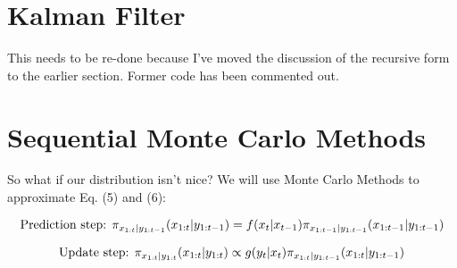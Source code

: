 \documentclass{article}
\begin{document}
\section{Kalman Filter}

This needs to be re-done because I've moved the discussion of the recursive form to the earlier section. Former code has been commented out.




\section{Sequential Monte Carlo Methods}

So what if our distribution isn't nice? We will use Monte Carlo Methods to approximate Eq. (5) and (6):

\begin{equation}
\textnormal{Prediction step:  }
\pi_{x_{1:t}|y_{1:t-1}}(x_{1:t}|y_{1:t-1})= f(x_t|x_{t-1}) \pi_{x_{1:t-1}|y_{1:t-1}}(x_{1:t-1}|y_{1:t-1})
\end{equation}

\begin{equation}
\textnormal{Update step:  }
\pi_{x_{1:t}|y_{1:t}}(x_{1:t}|y_{1:t})\propto g(y_t|x_t)\pi_{x_{1:t}|y_{1:t-1}}(x_{1:t}|y_{1:t-1})
\end{equation}
\end{document}
